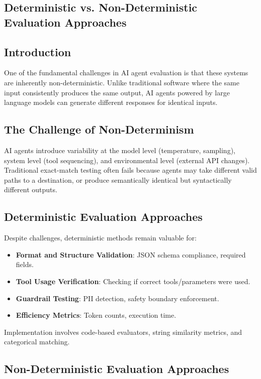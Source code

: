 \begin{TNtwocol}
\section{Deterministic vs. Non-Deterministic Evaluation Approaches }
\subsection{Introduction}
One of the fundamental challenges in AI agent evaluation is that these systems are inherently non-deterministic. Unlike traditional software where the same input consistently produces the same output, AI agents powered by large language models can generate different responses for identical inputs.

\subsection{The Challenge of Non-Determinism}
AI agents introduce variability at the model level (temperature, sampling), system level (tool sequencing), and environmental level (external API changes). Traditional exact-match testing often fails because agents may take different valid paths to a destination, or produce semantically identical but syntactically different outputs.

\subsection{Deterministic Evaluation Approaches}
Despite challenges, deterministic methods remain valuable for:
\begin{itemize}
    \item \textbf{Format and Structure Validation}: JSON schema compliance, required fields.
    \item \textbf{Tool Usage Verification}: Checking if correct tools/parameters were used.
    \item \textbf{Guardrail Testing}: PII detection, safety boundary enforcement.
    \item \textbf{Efficiency Metrics}: Token counts, execution time.
\end{itemize}
Implementation involves code-based evaluators, string similarity metrics, and categorical matching.

\subsection{Non-Deterministic Evaluation Approaches}

\end{TNtwocol}
